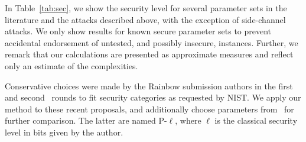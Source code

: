 \documentclass[12pt, a4paper, oneside]{memoir}
\theoremstyle{definition}
\begin{document}
In Table~\ref{tab:sec}, we show the security level for several parameter sets in the literature and the attacks described above, with the exception of side-channel attacks. We only show results for known secure parameter sets to prevent accidental endorsement of untested, and possibly insecure, instances. Further, we remark that our calculations are presented as approximate measures and reflect only an estimate of the complexities.

Conservative choices were made by the Rainbow submission authors in the first~\cite{Ding:201712} and second~\cite{Ding:201901} rounds to fit security categories as requested by NIST\@. We apply our method to these recent proposals, and additionally choose parameters from~\cite[Tabs.~6.12,~9.8]{Petzoldt:201307} for further comparison. The latter are named P-$\ell$, where $\ell$ is the classical security level in bits given by the author.
\end{document}
